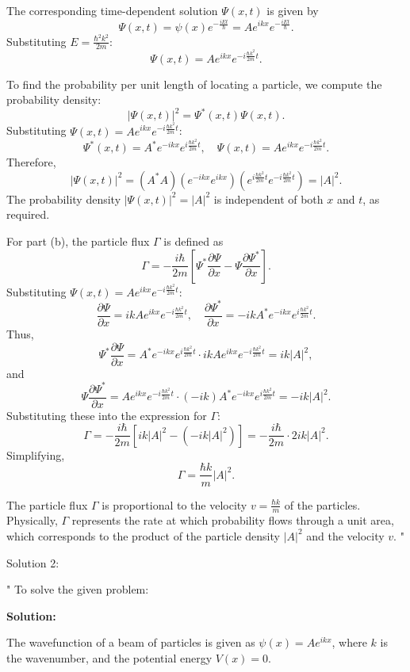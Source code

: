 The corresponding time-dependent solution $\Psi(x,t)$ is given by  
\[
\Psi(x,t) = \psi(x) e^{-\frac{iEt}{\hbar}} = A e^{ikx} e^{-\frac{iEt}{\hbar}}.
\]  
Substituting $E = \frac{\hbar^2 k^2}{2m}$:  
\[
\Psi(x,t) = A e^{ikx} e^{-i \frac{\hbar k^2}{2m} t}.
\]  

To find the probability per unit length of locating a particle, we compute the probability density:  
\[
|\Psi(x,t)|^2 = \Psi^*(x,t) \Psi(x,t).
\]  
Substituting $\Psi(x,t) = A e^{ikx} e^{-i \frac{\hbar k^2}{2m} t}$:  
\[
\Psi^*(x,t) = A^* e^{-ikx} e^{i \frac{\hbar k^2}{2m} t}, \quad \Psi(x,t) = A e^{ikx} e^{-i \frac{\hbar k^2}{2m} t}.
\]  
Therefore,  
\[
|\Psi(x,t)|^2 = \left(A^* A\right) \left(e^{-ikx} e^{ikx}\right) \left(e^{i \frac{\hbar k^2}{2m} t} e^{-i \frac{\hbar k^2}{2m} t}\right) = |A|^2.
\]  
The probability density $|\Psi(x,t)|^2 = |A|^2$ is independent of both $x$ and $t$, as required.  

For part (b), the particle flux $\Gamma$ is defined as  
\[
\Gamma = -\frac{i \hbar}{2m} \left[\Psi^* \frac{\partial \Psi}{\partial x} - \Psi \frac{\partial \Psi^*}{\partial x}\right].
\]  
Substituting $\Psi(x,t) = A e^{ikx} e^{-i \frac{\hbar k^2}{2m} t}$:  
\[
\frac{\partial \Psi}{\partial x} = ik A e^{ikx} e^{-i \frac{\hbar k^2}{2m} t}, \quad \frac{\partial \Psi^*}{\partial x} = -ik A^* e^{-ikx} e^{i \frac{\hbar k^2}{2m} t}.
\]  
Thus,  
\[
\Psi^* \frac{\partial \Psi}{\partial x} = A^* e^{-ikx} e^{i \frac{\hbar k^2}{2m} t} \cdot ik A e^{ikx} e^{-i \frac{\hbar k^2}{2m} t} = ik |A|^2,
\]  
and  
\[
\Psi \frac{\partial \Psi^*}{\partial x} = A e^{ikx} e^{-i \frac{\hbar k^2}{2m} t} \cdot (-ik) A^* e^{-ikx} e^{i \frac{\hbar k^2}{2m} t} = -ik |A|^2.
\]  
Substituting these into the expression for $\Gamma$:  
\[
\Gamma = -\frac{i \hbar}{2m} \left[ik |A|^2 - (-ik |A|^2)\right] = -\frac{i \hbar}{2m} \cdot 2ik |A|^2.
\]  
Simplifying,  
\[
\Gamma = \frac{\hbar k}{m} |A|^2.
\]  

The particle flux $\Gamma$ is proportional to the velocity $v = \frac{\hbar k}{m}$ of the particles. Physically, $\Gamma$ represents the rate at which probability flows through a unit area, which corresponds to the product of the particle density $|A|^2$ and the velocity $v$.
"

Solution 2: 

"
To solve the given problem:

\textbf{Solution:}

The wavefunction of a beam of particles is given as $\psi(x) = A e^{ikx}$, where $k$ is the wavenumber, and the potential energy $V(x) = 0$.

